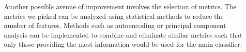 \documentclass[a4paper, 11pt]{article}
\begin{document}




Another possible avenue of improvement involves the selection of metrics. The metrics we picked can be analyzed using statistical methods to reduce the number of features. Methods such as autoencoding or principal component analysis can be implemented to combine and eliminate similar metrics such that only those providing the most information would be used for the main classifier. %
\end{document}
